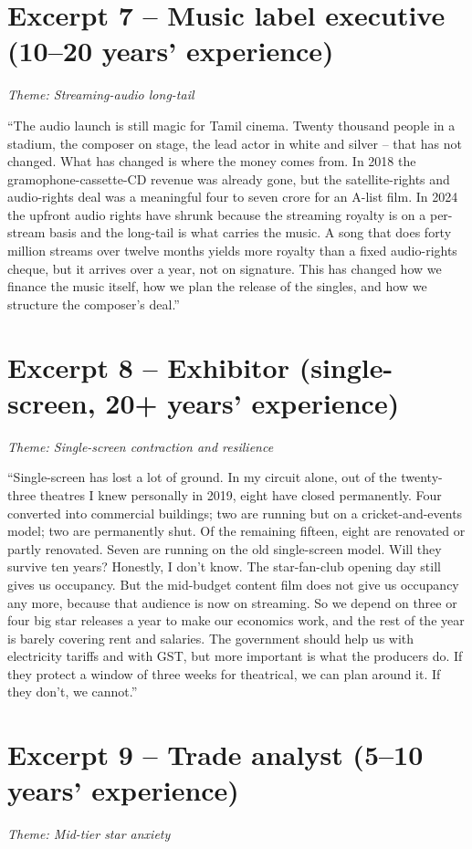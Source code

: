 \section*{Excerpt 7 -- Music label executive (10--20 years' experience)}
\textit{Theme: Streaming-audio long-tail}
\medskip

``The audio launch is still magic for Tamil cinema.  Twenty
thousand people in a stadium, the composer on stage, the lead actor
in white and silver -- that has not changed.  What has changed is
where the money comes from.  In 2018 the gramophone-cassette-CD
revenue was already gone, but the satellite-rights and audio-rights
deal was a meaningful four to seven crore for an A-list film.  In
2024 the upfront audio rights have shrunk because the streaming
royalty is on a per-stream basis and the long-tail is what carries
the music.  A song that does forty million streams over twelve
months yields more royalty than a fixed audio-rights cheque, but it
arrives over a year, not on signature.  This has changed how we
finance the music itself, how we plan the release of the singles,
and how we structure the composer's deal.''

\section*{Excerpt 8 -- Exhibitor (single-screen, 20+ years' experience)}
\textit{Theme: Single-screen contraction and resilience}
\medskip

``Single-screen has lost a lot of ground.  In my circuit alone,
out of the twenty-three theatres I knew personally in 2019, eight
have closed permanently.  Four converted into commercial buildings;
two are running but on a cricket-and-events model; two are
permanently shut.  Of the remaining fifteen, eight are renovated
or partly renovated.  Seven are running on the old single-screen
model.  Will they survive ten years?  Honestly, I don't know.  The
star-fan-club opening day still gives us occupancy.  But the
mid-budget content film does not give us occupancy any more,
because that audience is now on streaming.  So we depend on three
or four big star releases a year to make our economics work, and
the rest of the year is barely covering rent and salaries.  The
government should help us with electricity tariffs and with GST,
but more important is what the producers do.  If they protect a
window of three weeks for theatrical, we can plan around it.  If
they don't, we cannot.''

\section*{Excerpt 9 -- Trade analyst (5--10 years' experience)}
\textit{Theme: Mid-tier star anxiety}
\medskip

